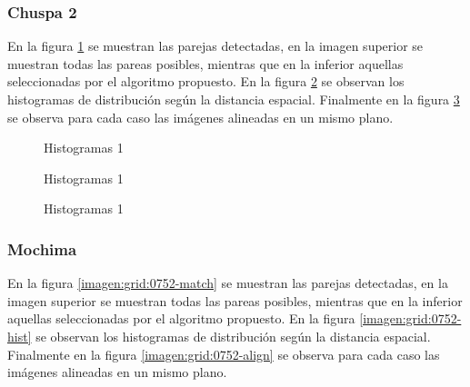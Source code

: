 \subsubsection*{Chuspa 2}

En la figura \ref{imagen:grid:0234-match} se muestran las parejas detectadas, en la imagen superior se muestran todas las pareas posibles, mientras que en la inferior aquellas seleccionadas por el algoritmo propuesto. En la figura \ref{imagen:grid:0234-hist} se observan los histogramas de distribución según la distancia espacial. Finalmente en la figura \ref{imagen:grid:0234-align} se observa para cada caso las imágenes alineadas en un mismo plano.

\begin{figure}[h]
	\centering     %
	\hspace{1mm}%
	
	\caption[Histogramas 1]{Histogramas 1}
	\label{imagen:grid:0234-match}
\end{figure}


\begin{figure}[h]
	\centering     %
	\hspace{3mm}%
	
	\caption[Histogramas 1]{Histogramas 1}
	\label{imagen:grid:0234-hist}
\end{figure}
\begin{figure}[h]
	\centering     %
	\hspace{1mm}%
	
	\caption[Histogramas 1]{Histogramas 1}
	\label{imagen:grid:0234-align}
\end{figure}


\subsubsection*{Mochima}

En la figura \ref{imagen:grid:0752-match} se muestran las parejas detectadas, en la imagen superior se muestran todas las pareas posibles, mientras que en la inferior aquellas seleccionadas por el algoritmo propuesto. En la figura \ref{imagen:grid:0752-hist} se observan los histogramas de distribución según la distancia espacial. Finalmente en la figura \ref{imagen:grid:0752-align} se observa para cada caso las imágenes alineadas en un mismo plano.

